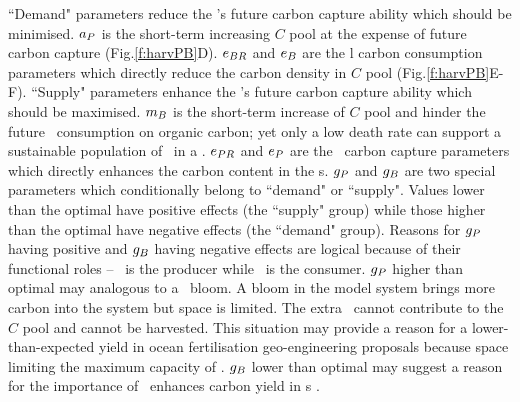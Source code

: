 \documentclass[../thesis.tex]{subfiles} %
\begin{document}
``Demand" parameters reduce the \pbs's future carbon capture ability which should be minimised.  $a_P$ is the short-term increasing $C$ pool at the expense of future carbon capture (Fig.\ref{f:harvPB}D).  $e_{BR}$ and $e_B$ are the \bac l carbon consumption parameters which directly reduce the carbon density in $C$ pool (Fig.\ref{f:harvPB}E-F).  ``Supply" parameters enhance the \pbs's future carbon capture ability which should be maximised.  $m_B$ is the short-term increase of $C$ pool and hinder the future \bac\ consumption on organic carbon; yet only a low death rate can support a sustainable population of \bac\ in a \pbs. $e_{PR}$ and $e_P$ are the \phy\ carbon capture parameters which directly enhances the carbon content in the \pbs s.  $g_P$ and $g_B$ are two special parameters which conditionally belong to ``demand" or ``supply".  Values lower than the optimal have positive effects (the ``supply" group) while those higher than the optimal have negative effects (the ``demand" group).  Reasons for $g_P$ having positive and $g_B$ having negative effects are logical because of their functional roles -- \phy\ is the producer while \bac\ is the consumer.  $g_P$ higher than optimal may analogous to a \phy\ bloom.  A bloom in the model system brings more carbon into the system but space is limited.  The extra \phy\ cannot contribute to the $C$ pool and cannot be harvested.  This situation may provide a reason for a lower-than-expected yield in ocean fertilisation geo-engineering proposals \autocite{boyd2008implications,gnanadesikan2008export,oschlies2010side} because space limiting the maximum capacity of \phy.  $g_B$ lower than optimal may suggest a reason for the importance of \bac\ enhances carbon yield in \pbs s \autocite{fuentes2016impact,santos2014microalgal}.
\end{document}
